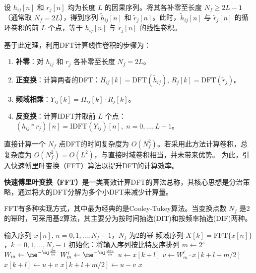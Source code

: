 \begin{theorem}[基于DFT的线性卷积计算]
    \label{thm:dft-linear-conv}
    设 $h_{ij}[n]$ 和 $r_j[n]$ 均为长度 $L$ 的因果序列。将其各补零至长度 $N_f \ge 2L-1$（通常取 $N_f = 2L$），得到序列 $\tilde{h}_{ij}[n]$ 和 $\tilde{r}_j[n]$。此时，$\tilde{h}_{ij}[n]$ 与 $\tilde{r}_j[n]$ 的循环卷积的前 $L$ 个点，等于 $h_{ij}[n]$ 与 $r_j[n]$ 的线性卷积。
\end{theorem}

基于此定理，利用DFT计算线性卷积的步骤为：
\begin{enumerate}
    \item \textbf{补零}：对 $h_{ij}$ 和 $r_j$ 各补零至长度 $N_f = 2L$。
    \item \textbf{正变换}：计算两者的DFT：$H_{ij}[k] = \mathrm{DFT}(\tilde{h}_{ij})$, $R_j[k] = \mathrm{DFT}(\tilde{r}_j)$。
    \item \textbf{频域相乘}：$Y_{ij}[k] = H_{ij}[k] \cdot R_j[k]$。
    \item \textbf{反变换}：计算IDFT并取前 $L$ 个点：$(h_{ij} * r_j)[n] = \mathrm{IDFT}(Y_{ij})[n],\; n=0,\dots,L-1$。
\end{enumerate}

直接计算一个 $N_f$ 点DFT的时间复杂度为 $O(N_f^2)$。若采用此方法计算卷积，总复杂度为 $O(N_f^2) = O(L^2)$，与直接时域卷积相当，并未带来优势。
为此，引入快速傅里叶变换（FFT）算法以提升DFT的计算效率。

\textbf{快速傅里叶变换（FFT）}是一类高效计算DFT的算法总称，其核心思想是分治策略，通过将大的DFT分解为多个小DFT来减少计算量。%

FFT有多种实现方式，其中最为经典的是Cooley-Tukey算法。当变换点数 $N_f$ 是2的幂时，可采用基2算法，其主要分为按时间抽选(DIT)和按频率抽选(DIF)两种。

\begin{algorithm}
    \caption{基2 FFT算法（按时间抽选, DIT）}
    \label{alg:fft-dit}
    \begin{algorithmic}[1]
        \Require 输入序列 $x[n]$, $n=0,1,\dots,N_f-1$，$N_f$ 为2的幂
        \Ensure 频域序列 $X[k] = \mathrm{FFT}\{x[n]\}$，$k=0,1,\dots,N_f-1$
        \State 初始化：将输入序列按比特反序排列
         
        \State $m \gets 2^s$ 
        \State $W_m \gets \me^{-\mj\frac{2\pi}{m}}$ 
        \State $W_m^i \gets \me^{-\mj\frac{2\pi i}{m}}$ 
        \EndFor
         
         
        \State $u \gets x[k + l]$
        \State $v \gets W_m^l \cdot x[k + l + m/2]$
        \State $x[k + l] \gets u + v$
        \State $x[k + l + m/2] \gets u - v$
        \EndFor
        \EndFor
        \EndFor
        \State \Return $x$ 
    \end{algorithmic}
\end{algorithm}

